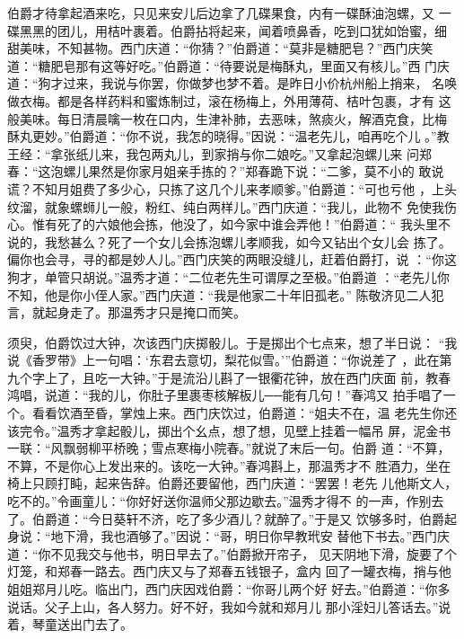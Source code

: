 伯爵才待拿起酒来吃，只见来安儿后边拿了几碟果食，内有一碟酥油泡螺，又
一碟黑黑的团儿，用桔叶裹着。伯爵拈将起来，闻着喷鼻香，吃到口犹如饴蜜，细
甜美味，不知甚物。西门庆道：“你猜？”伯爵道：“莫非是糖肥皂？”西门庆笑
道：“糖肥皂那有这等好吃。”伯爵道：“待要说是梅酥丸，里面又有核儿。”西
门庆道：“狗才过来，我说与你罢，你做梦也梦不着。是昨日小价杭州船上捎来，
名唤做衣梅。都是各样药料和蜜炼制过，滚在杨梅上，外用薄荷、桔叶包裹，才有
这般美味。每日清晨噙一枚在口内，生津补肺，去恶味，煞痰火，解酒克食，比梅
酥丸更妙。”伯爵道：“你不说，我怎的晓得。”因说：“温老先儿，咱再吃个儿
。”教王经：“拿张纸儿来，我包两丸儿，到家捎与你二娘吃。”又拿起泡螺儿来
问郑春：“这泡螺儿果然是你家月姐亲手拣的？”郑春跪下说：“二爹，莫不小的
敢说谎？不知月姐费了多少心，只拣了这几个儿来孝顺爹。”伯爵道：“可也亏他
，上头纹溜，就象螺蛳儿一般，粉红、纯白两样儿。”西门庆道：“我儿，此物不
免使我伤心。惟有死了的六娘他会拣，他没了，如今家中谁会弄他！”伯爵道：“
我头里不说的，我愁甚么？死了一个女儿会拣泡螺儿孝顺我，如今又钻出个女儿会
拣了。偏你也会寻，寻的都是妙人儿。”西门庆笑的两眼没缝儿，赶着伯爵打，说
：“你这狗才，单管只胡说。”温秀才道：“二位老先生可谓厚之至极。”伯爵道
：“老先儿你不知，他是你小侄人家。”西门庆道：“我是他家二十年旧孤老。”
陈敬济见二人犯言，就起身走了。那温秀才只是掩口而笑。

须臾，伯爵饮过大钟，次该西门庆掷骰儿。于是掷出个七点来，想了半日说：
“我说《香罗带》上一句唱：‘东君去意切，梨花似雪。’”伯爵道：“你说差了
，此在第九个字上了，且吃一大钟。”于是流沿儿斟了一银衢花钟，放在西门庆面
前，教春鸿唱，说道：“我的儿，你肚子里裹枣核解板儿──能有几句！”春鸿又
拍手唱了一个。看看饮酒至昏，掌烛上来。西门庆饮过，伯爵道：“姐夫不在，温
老先生你还该完令。”温秀才拿起骰儿，掷出个幺点，想了想，见壁上挂着一幅吊
屏，泥金书一联：“风飘弱柳平桥晚；雪点寒梅小院春。”就说了末后一句。伯爵
道：“不算，不算，不是你心上发出来的。该吃一大钟。”春鸿斟上，那温秀才不
胜酒力，坐在椅上只顾打盹，起来告辞。伯爵还要留他，西门庆道：“罢罢！老先
儿他斯文人，吃不的。”令画童儿：“你好好送你温师父那边歇去。”温秀才得不
的一声，作别去了。伯爵道：“今日葵轩不济，吃了多少酒儿？就醉了。”于是又
饮够多时，伯爵起身说：“地下滑，我也酒够了。”因说：“哥，明日你早教玳安
替他下书去。”西门庆道：“你不见我交与他书，明日早去了。”伯爵掀开帘子，
见天阴地下滑，旋要了个灯笼，和郑春一路去。西门庆又与了郑春五钱银子，盒内
回了一罐衣梅，捎与他姐姐郑月儿吃。临出门，西门庆因戏伯爵：“你哥儿两个好
好去。”伯爵道：“你多说话。父子上山，各人努力。好不好，我如今就和郑月儿
那小淫妇儿答话去。”说着，琴童送出门去了。

